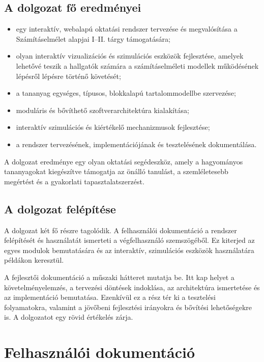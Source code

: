 \documentclass[12pt,a4paper]{report}
\begin{document}
\section{A dolgozat fő eredményei}

\begin{itemize}
    \item egy interaktív, webalapú oktatási rendszer tervezése és
          megvalósítása a Számításelmélet alapjai I--II. tárgy támogatására;
    \item olyan interaktív vizualizációs és szimulációs eszközök fejlesztése, amelyek
     lehetővé teszik a hallgatók számára a számításelméleti modellek működésének lépésről 
     lépésre történő követését;
    \item a tananyag egységes, típusos, blokkalapú tartalommodellbe
          szervezése;
    \item moduláris és bővíthető szoftverarchitektúra kialakítása;
    \item interaktív szimulációs és kiértékelő mechanizmusok fejlesztése;
    \item a rendszer tervezésének, implementációjának és tesztelésének
          dokumentálása.
\end{itemize}

A dolgozat eredménye egy olyan oktatási segédeszköz, amely a
hagyományos tananyagokat kiegészítve támogatja az önálló tanulást, a
szemléletesebb megértést és a gyakorlati tapasztalatszerzést.

\section{A dolgozat felépítése}
A dolgozat két fő részre tagolódik.
A felhasználói dokumentáció a rendszer felépítését és használatát
ismerteti a végfelhasználó szemszögéből. Ez kiterjed az egyes modulok
bemutatására és az interaktív, szimulációs eszközök használatára
példákon keresztül.

A fejlesztői dokumentáció a műszaki hátteret mutatja be. Itt kap helyet
a követelményelemzés, a tervezési döntések indoklása, az architektúra
ismertetése és az implementáció bemutatása. Ezenkívül ez a rész tér ki
a tesztelési folyamatokra, valamint a jövőbeni fejlesztési irányokra
és bővítési lehetőségekre is.
A dolgozatot egy rövid értékelés zárja.

\chapter{Felhasználói dokumentáció}
\end{document}
